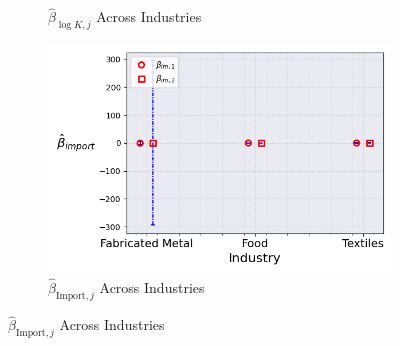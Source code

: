\documentclass{article}
\begin{document}
\begin{figure}[ht!]
\begin{subfigure}[t]{0.32\textwidth}
        \caption{$\hat{\beta}_{\log K, j}$ Across Industries}
    \end{subfigure}
    \begin{subfigure}[t]{0.32\textwidth}
        \centering
        \includegraphics[width=\textwidth]{figure/ar1_normal_kmshare_ciiu_beta_im_across_industries_m2.png}
        \caption{$\hat{\beta}_{\text{Import},j}$ Across Industries}
    \end{subfigure}
\end{figure}
\end{document}
